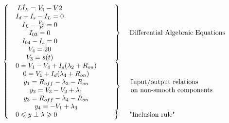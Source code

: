 \documentclass{article}
\def\geq{\geqslant}
\def\leq{\leqslant}
\begin{document}
\begin{equation}
  \label{eq:72}
 \left\{ \begin{array}{l l l}
    \begin{array}{c}
      L \dot I_L = V_1-V2\\
      I_d+I_s-I_L=0\\
      I_L-\frac{V_2}{R}=0\\
      I_{03}=0\\
      I_{04}-I_{s}=0\\
      V_4=20\\
      V_3=s(t)\\
\end{array}
& \left.\begin{array}{c}
      \\
      \\
      \\
      \\
      \\
      \\
      \\
\end{array}\right\}& \text{ Differential Algebraic Equations}\\[2mm]
  \begin{array}{c}
    0 = V_1-V_4+I_s(\lambda_2+R_{on}) \\
    0 = V_1+I_d(\lambda_4+R_{on}) \\
    y_1 = R_{off}-\lambda_2-R_{on}\\
    y_2 = V_3-V_2+\lambda_1\\
    y_3 = R_{off}-\lambda_4-R_{on}\\
    y_4 = -V_1+\lambda_3\\
  \end{array} & \left.\begin{array}{c}
     \\
     \\
    \\
    \\
    \\
    \\
  \end{array}\right\} & \begin{array}{l}
   \text{Input/output relations }\\
   \text{on non-smooth components}
  \end{array}  \\[5mm]
  \begin{array}{c}
  0 \leq y \perp \lambda \geq 0
\end{array} 
& \left.\begin{array}{c}\\ \end{array}\right\}  &  \text{ "Inclusion rule"}\\ 
\end{array}\right.
\end{equation}
\end{document}
